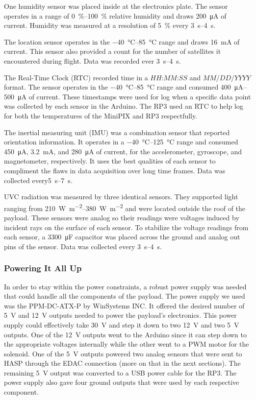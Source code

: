 One humidity sensor was placed inside at the electronics plate.  The sensor operates in a range of \SIrange{0}{100}{\percent} relative humidity and draws \SI{200}{\micro\ampere} of current.  Humidity was measured at a resolution of \SI{5}{\percent} every \SIrange{3}{4}{\second}.

The location sensor operates in the \SIrange{-40}{85}{\celsius} range and draws \SI{16}{\milli\ampere} of current.  This sensor also provided a count for the number of satellites it encountered during flight.  Data was  recorded ever \SIrange{3}{4}{\second}. 
 
The Real-Time Clock (RTC) recorded time in a $HH$:$MM$:$SS$ and $MM/DD/YYYY$ format.  The sensor operates in the \SIrange{-40}{85}{\celsius} range and consumed \SIrange{400}{500}{\micro\ampere} of current.  These timestamps  were used for log when a specific data point was collected by each sensor in the Arduino.  The RP3  used an RTC to help log for both the temperatures of the MiniPIX and RP3 respectfully.

The inertial measuring unit (IMU) was a combination sensor that reported orientation information.  It operates in a \SIrange{-40}{125}{\celsius} range and consumed \SI{450}{\micro\ampere}, \SI{3.2}{\milli\ampere}, and \SI{280}{\micro\ampere} of current, for the accelerometer, gyroscope, and magnetometer, respectively.  It uses the best qualities of each sensor to compliment the flaws in data acquisition over long time frames.  Data was collected every\SIrange{5}{7}{\second}.
 
 UVC radiation was measured by three identical sensors.  They supported light ranging from \SIrange{210}{380}{\watt\per\square\meter} and were located outside the roof of the payload.  These sensors were analog so their readings were voltages induced by incident rays on the surface of each sensor. To stabilize the voltage readings from each sensor, a \SI{3300}{\micro\farad} capacitor was placed across the ground and analog out pins of the sensor.  Data was collected every \SIrange{3}{4}{\second}.


\subsubsection{Powering It All Up}

In order to stay within the power constraints, a robust power supply was needed that could handle all the components of the payload.  The power supply we used was the PPM-DC-ATX-P by WinSystems INC.  It offered the desired number of \SI{+5}{\volt} and \SI{+12}{\volt} outputs needed to power the payload's electronics.  This power supply could effectively take \SI{+30}{\volt} and step it down to two \SI{+12}{\volt} and two \SI{+5 }{\volt} outputs.  One of the \SI{+12}{\volt} outputs went to the Arduino since it can step down to the appropriate voltages internally while the other went to a PWM motor for the solenoid.  One of the \SI{+5 }{\volt} outputs powered two analog sensors that were sent to HASP through the EDAC connection (more on that in the next sections).  The remaining \SI{+5 }{\volt} output was converted to a USB power cable for the RP3.  The power supply also gave four ground outputs that were used by each respective component. 

